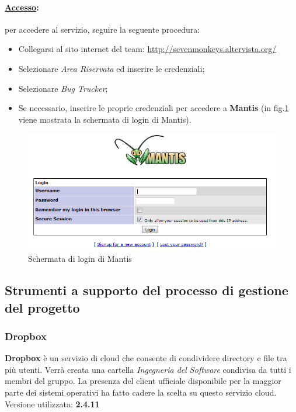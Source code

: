 \paragraph{\underline{Accesso}:} per accedere al servizio, seguire la seguente procedura:
\begin{itemize}
\item Collegarsi al sito internet del team: \url{http://sevenmonkeys.altervista.org/}
\item Selezionare \textit{Area Riservata} ed inserire le credenziali;
\item Selezionare \textit{Bug Trucker};
\item Se necessario, inserire le proprie credenziali per accedere a \textbf{Mantis} (in fig.\ref{login_password} viene mostrata la schermata di login di Mantis).
\end{itemize}
\begin{figure}[h!]
	\centering
	\includegraphics[scale=0.6]{./content/Immagini/mantis}
	\caption{Schermata di login di Mantis}
	\label{login_password}
\end{figure}

\subsection{Strumenti a supporto del processo di gestione del progetto}

\subsubsection{Dropbox}
\label{dropbox}
\textbf{Dropbox} è un servizio di cloud che consente di condividere directory e file tra più utenti. Verrà creata una cartella \textit{Ingegneria del Software} condivisa da tutti i membri del gruppo. La presenza del client ufficiale disponibile per la maggior parte dei sistemi operativi ha fatto cadere la scelta su questo servizio cloud.\\
Versione utilizzata: \textbf{2.4.11}

